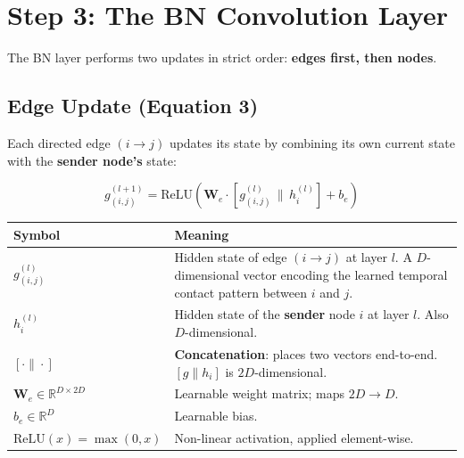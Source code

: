 \section{Step 3: The BN Convolution Layer}

The BN layer performs two updates in strict order: \textbf{edges first, then nodes}.

\subsection{Edge Update (Equation 3)}

Each directed edge $(i \to j)$ updates its state by combining its own current state with the \textbf{sender node's} state:

\begin{equation}
\boxed{g_{(i,j)}^{(l+1)} = \text{ReLU}\!\left(\mathbf{W}_e \cdot \left[g_{(i,j)}^{(l)} \,\big\|\, h_i^{(l)}\right] + b_e\right)}
\label{eq:edge_update}
\end{equation}

\begin{center}
\renewcommand{\arraystretch}{1.4}
\begin{tabular}{p{} p{}}
\toprule
\textbf{Symbol} & \textbf{Meaning} \\
\midrule
$g_{(i,j)}^{(l)}$ & Hidden state of edge $(i \to j)$ at layer $l$. A $D$-dimensional vector encoding the learned temporal contact pattern between $i$ and $j$. \\
$h_i^{(l)}$ & Hidden state of the \textbf{sender} node $i$ at layer $l$. Also $D$-dimensional. \\
$[\cdot \| \cdot]$ & \textbf{Concatenation}: places two vectors end-to-end. $[g \| h_i]$ is $2D$-dimensional. \\
$\mathbf{W}_e \in \mathbb{R}^{D \times 2D}$ & Learnable weight matrix; maps $2D \to D$. \\
$b_e \in \mathbb{R}^D$ & Learnable bias. \\
$\text{ReLU}(x) = \max(0,x)$ & Non-linear activation, applied element-wise. \\
\bottomrule
\end{tabular}
\end{center}

